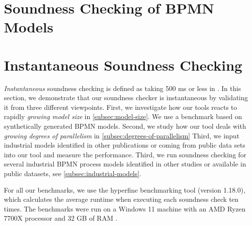 \documentclass[runningheads]{llncs}
\begin{document}

\cite{corradiniClassificationBPMNCollaborations2018}


\section{Soundness Checking of BPMN Models}

\section{Instantaneous Soundness Checking}
\textit{Instantaneous} soundness checking is defined as taking 500 ms or less in \cite{fahlandAnalysisDemandInstantaneous2011}.
In this section, we demonstrate that our soundness checker is instantaneous by validating it from three different viewpoints.
First, we investigate how our tools reacts to rapidly \textit{growing model size} in \autoref{subsec:model-size}.
We use a benchmark based on synthetically generated BPMN models.
Second, we study how our tool deals with \textit{growing degrees of parallelism} in \autoref{subsec:degrees-of-parallelism}
Third, we input industrial models identified in other publications or coming from public data sets into our tool and measure the performance.
Third, we run soundness checking for several industrial BPMN process models identified in other studies or available in public datasets, see \autoref{subsec:industrial-models}. %

For all our benchmarks, we use the hyperfine benchmarking tool \cite{peterHyperfine2023} (version 1.18.0), which calculates the average runtime when executing each soundness check ten times.
The benchmarks were run on a Windows 11 machine with an AMD Ryzen 7700X processor and 32 GB of RAM \cite{noauthorgivenBPM2024Artifacts2024}.
\end{document}
